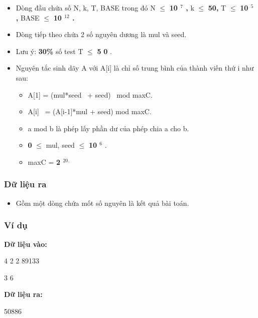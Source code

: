 \begin{itemize}
	\item      Dòng đầu chứa số N, k, T, BASE trong đó N  $\le$      \textbf{      10      $^       7      $      ,     }     k  $\le$      \textbf{      50,     }     T  $\le$      \textbf{      10      $^       5      $      ,     }     BASE  $\le$      \textbf{      10      $^       12      $      .     }
	\item      Dòng tiếp theo chứa 2 số nguyên dương là mul và seed.    
	\item      Lưu ý:     \textbf{      30\%     }     số test T  $\le$      \textbf{      5     }\textbf{      0     }     .    
	\item      Nguyên tắc sinh dãy A với A[i] là chỉ số trung bình của thành viến thứ i như sau:    
\begin{itemize}
	\item        A[1] = (mul*seed  + seed)  mod maxC.      
	\item        A[i]  = (A[i-1]*mul + seed) mod maxC.      
	\item        a mod b là phép lấy phần dư của phép chia a cho b.      
	\item \textbf{        0       }        $\le$  mul, seed  $\le$        \textbf{        10        $^         6        $}       .      
	\item        maxC =       \textbf{\textbf{         2        }$^         20        $$^         .        $}
\end{itemize}
\end{itemize}



\subsubsection{    Dữ liệu ra   }


\begin{itemize}
	\item      Gồm một dòng chứa mốt số nguyên là kết quả bài toán.    
\end{itemize}



\subsubsection{    Ví dụ   }



\textbf{     Dữ liệu vào:    }

    4 2 2 89133   

    3 6   

\textbf{     Dữ liệu ra:    }

    50886   



